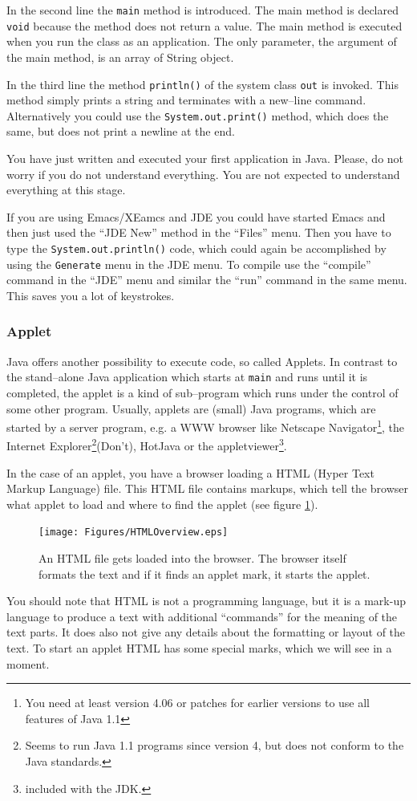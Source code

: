In the second line the \verb|main| method is introduced. The main
method is declared \verb|void| because the method does not return a
value. The main method is executed when you run the class as an
application. The only parameter, the argument
of the main method, is an array of String object.

In the third line the method \verb|println()| of the system class 
\verb|out|
is invoked. This method simply prints a string and terminates with a 
new--line command. Alternatively you could use the 
\verb|System.out.print()| method, which does the same, but does
not print a newline at the end. 

You have just written and executed your first application in
Java. Please, do not worry if you do not understand everything. You are
not expected to understand everything at this stage.

If you are using Emacs/XEamcs and JDE you could have started Emacs and
then just used the ``JDE New'' method in the ``Files'' menu. Then you
have to type the \verb|System.out.println()| code, which could
again be accomplished by using the \verb|Generate| menu in the
JDE menu. To compile
use the ``compile'' command in the ``JDE'' menu and similar
the ``run'' command in the same menu. This saves you a lot of keystrokes. 

\subsubsection{Applet}
\label{sec:Applet}

Java offers another possibility to execute code, so called Applets.
In contrast to the stand--alone Java application which starts at
\verb!main! and runs until it is completed, the applet is a kind of
sub--program which runs under the control of some other program.
Usually, applets are (small) Java programs, which are started by a 
server program,
e.g. a WWW browser like Netscape Navigator\footnote{You need at least 
version 4.06 or patches for earlier versions to use all features of Java 1.1}, 
the Internet Explorer\footnote{Seems to run Java 1.1 programs since
version 4, but does not conform to the Java standards.}(Don't),
HotJava or the appletviewer\footnote{included with the JDK.}.

In the case of an applet, you have a browser loading a HTML 
(Hyper Text Markup Language) file. This HTML file contains
markups, which tell the browser what applet to load and
where to find the applet (see figure \ref{fig:HTMLOverview}). 
\begin{figure}[htbp]
  \begin{center}
    \texttt{[image: Figures/HTMLOverview.eps]}
    \caption{An HTML file gets loaded into the browser. The browser itself formats the text and if it finds an applet mark, it starts the applet.}
    \label{fig:HTMLOverview}
  \end{center}
\end{figure}
You should note that HTML is not a programming language, but
it is a mark-up language to produce a text with additional
``commands'' for the meaning of the text parts. It does also
not give any details about the formatting or layout of the
text. To start an applet HTML has some special marks, which we
will see in a moment.  

